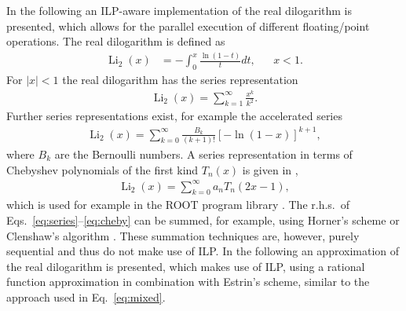 \documentclass[10pt,DIV16,twocolumn,numbers=noenddot]{scrartcl}
\newcommand{\Li}{\operatorname{Li}_2}
\begin{document}
In the following an ILP-aware implementation of the real dilogarithm
is presented, which allows for the parallel execution of different
floating\-/point operations.  The real dilogarithm is defined as
%
\begin{align}
  \Li(x) &= -\int_0^x \frac{\ln(1-t)}{t}dt, &
  &x<1.
\end{align}
%
For $|x|<1$ the real dilogarithm has the series representation
%
\begin{align}
  \Li(x) = \sum_{k=1}^\infty \frac{x^k}{k^2}.
  \label{eq:series}
\end{align}
%
Further series representations exist, for example the accelerated
series
%
\begin{align}
  \Li(x) = \sum_{k=0}^\infty \frac{B_k}{(k+1)!} [-\ln(1-x)]^{k+1},
\end{align}
%
where $B_k$ are the Bernoulli numbers.  A series representation in
terms of Chebyshev polynomials of the first kind $T_n(x)$ is given in
\cite{luke},
%
\begin{align}
  \Li(x) = \sum_{k=0}^\infty a_n T_n(2x-1),
  \label{eq:cheby}
\end{align}
%
which is used for example in the ROOT program library \cite{root}.
The r.h.s.\ of Eqs.~\eqref{eq:series}--\eqref{eq:cheby} can be summed,
for example, using Horner's scheme or Clenshaw's algorithm
\cite{clenshaw}.  These summation techniques are, however, purely
sequential and thus do not make use of ILP.  In the following an
approximation of the real dilogarithm is presented, which makes use of
ILP, using a rational function approximation in combination with
Estrin's scheme, similar to the approach used in
Eq.~\eqref{eq:mixed}.
\end{document}
